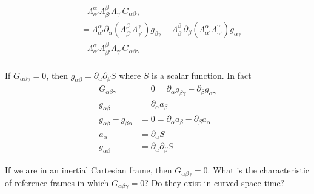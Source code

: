 \documentclass[11pt]{article}
\begin{document}
\begin{equation*}
\begin{aligned}
		&+\Lambda_{\alpha'}^{\alpha}\Lambda_{\beta'}^{\beta}\Lambda_{\gamma'} G_{\alpha\beta\gamma} \\
		&=\Lambda_{\alpha'}^{\alpha}\partial_{\alpha}\left(\Lambda_{\beta'}^{\beta}\Lambda_{\gamma'}^{\gamma}\right)g_{\beta\gamma} -\Lambda_{\beta'}^{\beta}\partial_{\beta}\left(\Lambda_{\alpha'}^{\alpha}\Lambda_{\gamma'}^{\gamma}\right)g_{\alpha\gamma} \\
		&+\Lambda_{\alpha'}^{\alpha}\Lambda_{\beta'}^{\beta}\Lambda_{\gamma'} G_{\alpha\beta\gamma} \\
	\end{aligned}
\end{equation*}

If $G_{\alpha\beta\gamma}=0$, then $g_{\alpha\beta} = \partial_\alpha \partial_\beta S$ where $S$ is a scalar function. In fact
\begin{equation}
	\begin{aligned}
		G_{\alpha\beta\gamma}&=0=\partial_\alpha g_{\beta \gamma} - \partial_\beta g_{\alpha \gamma} \\
		g_{\alpha \beta} &= \partial_\alpha a_\beta \\
		g_{\alpha \beta} - g_{\beta \alpha} &= 0 = \partial_\alpha a_\beta - \partial_\beta a_\alpha \\
		a_\alpha &= \partial_\alpha S \\
		g_{\alpha \beta} &= \partial_\alpha \partial_\beta S
	\end{aligned}
\end{equation}

If we are in an inertial Cartesian frame, then $G_{\alpha\beta\gamma}=0$. What is the characteristic of reference frames in which $G_{\alpha\beta\gamma}=0$? Do they exist in curved space-time?


\begin{thebibliography}{0}
	
\end{thebibliography}
\end{document}
